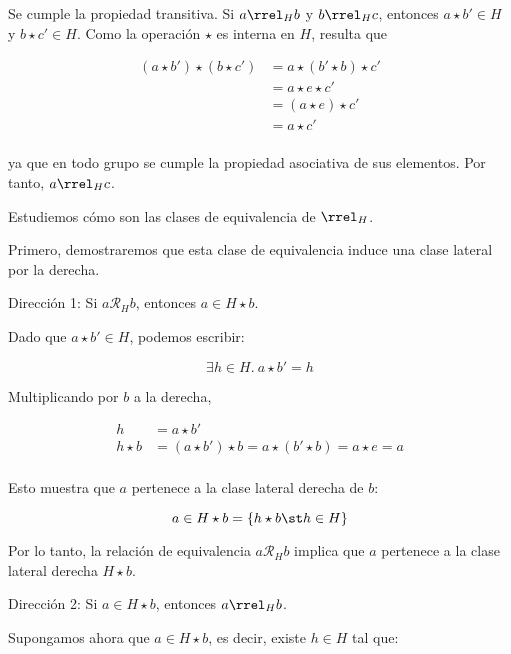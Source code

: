 
Se cumple la propiedad transitiva. Si $a \rrel_H b$ y $b \rrel_H c$,
entonces $a \star b' \in H$ y $b \star c' \in H$. Como la operación $\star$
es interna en $H$, resulta que

\begin{align*}
  (a \star b') \star (b \star c')
    &= a \star (b' \star b) \star c' \\
    &= a \star e \star c' \\
    &= (a \star e) \star c' \\
    &= a \star c' \\
\end{align*}

\noindent ya que en todo grupo se cumple la propiedad asociativa de sus
elementos. Por tanto, $a \rrel_H c$.



Estudiemos cómo son las clases de equivalencia de $\rrel_H$.




Primero, demostraremos que esta clase de equivalencia induce una clase
lateral por la derecha.

Dirección 1: Si $a \mathcal{R}_H b$, entonces $a \in H \star b$.

Dado que $a \star b' \in H$, podemos escribir:

$$ \exists h \in H. \ a \star b' = h $$

Multiplicando por $b$ a la derecha,

\begin{align*}
  h &= a \star b' \\
  h \star b &= (a \star b') \star b = a \star (b' \star b) = a \star e = a \\
\end{align*}

\noindent Esto muestra que $a$ pertenece a la clase lateral derecha de $b$:

$$ a \in H \star b = \{ h \star b \st h \in H \} $$

Por lo tanto, la relación de equivalencia $a \mathcal{R}_H b$ implica que
$a$ pertenece a la clase lateral derecha $H \star b$.

Dirección 2: Si $a \in H \star b$, entonces $a \rrel_H b$.

Supongamos ahora que $a \in H \star b$, es decir, existe $h \in H$ tal que:


